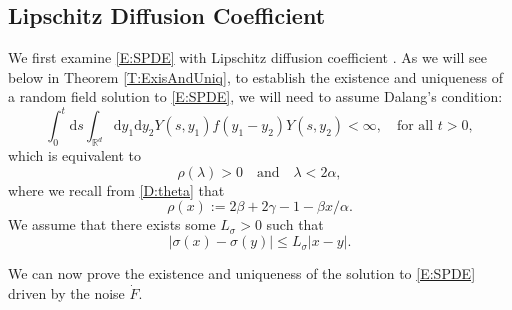 \documentclass[a4paper,11pt]{article}
\numberwithin{equation}{section}
\theoremstyle{plain}
\theoremstyle{definition}
\newcommand{\ud}{\ensuremath{\mathrm{d} }}
\newcommand{\R}{\mathbb{R}}
\numberwithin{NQ}{section}
\numberwithin{LQ}{section}
\numberwithin{ZQ}{section}
\begin{document}
	\subsection{Lipschitz Diffusion Coefficient}
	We first examine \eqref{E:SPDE} with Lipschitz diffusion coefficient . As we will see below in Theorem \ref{T:ExisAndUniq}, to establish the existence and uniqueness of a random field solution to \eqref{E:SPDE}, we will need to assume Dalang's condition:
	\begin{equation}
	\label{C:DalangCl}
	\int_0^t \ud s \int_{\R^d} \ud y_1 \ud y_2 Y(s,y_1) f(y_1-y_2) Y(s,y_2 )< \infty, \quad \text{for all } t>0,
	\end{equation} 
	which is equivalent to
	\begin{equation}
	\label{E:DalangEquiv2Cl}
	\rho(\lambda) > 0 \quad \text{and} \quad \lambda < 2\alpha,
	\end{equation}
	where we recall from \eqref{D:theta} that
	\begin{equation}
	\rho(x) := 2\beta + 2\gamma -1 -\beta x / \alpha.
	\end{equation}
	We assume that there exists some $L_\sigma > 0$ such that 
	\[
	|\sigma(x) - \sigma(y)| \le L_{\sigma} |x-y|.
	\]


	We can now prove the existence and uniqueness of the solution to \eqref{E:SPDE} driven by the noise $\dot{F}$. 
	
\end{document}
